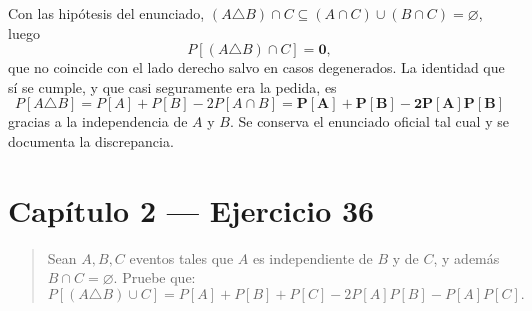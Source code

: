 \documentclass[11pt]{article}
\begin{document}
\begin{resp}
Con las hip\'otesis del enunciado, $(A\triangle B)\cap C\subseteq (A\cap C)\cup(B\cap C)=\varnothing$, luego
\[
P[(A\triangle B)\cap C]=\mathbf{0},
\]
que no coincide con el lado derecho salvo en casos degenerados. La identidad que s\'i se cumple, y que casi seguramente era la pedida, es
\[
P[A\triangle B]=P[A]+P[B]-2P[A\cap B]=\mathbf{P[A]+P[B]-2P[A]P[B]}
\]
gracias a la independencia de $A$ y $B$. Se conserva el enunciado oficial tal cual y se documenta la discrepancia.
\end{resp}

\section*{Cap\'itulo 2 --- Ejercicio 36}

\begin{quote}
Sean $A,B,C$ eventos tales que $A$ es independiente de $B$ y de $C$, y adem\'as $B\cap C=\varnothing$. Pruebe que:
\[
P[(A\triangle B)\cup C]=P[A]+P[B]+P[C]-2P[A]P[B]-P[A]P[C].
\]
\end{quote}
\end{document}
